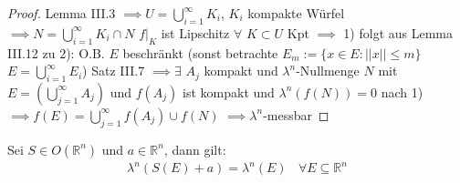     \begin{proof}
	Lemma III.3 $\implies U = \bigcup\limits_{i=1}^{\infty}K_i$, $K_i$ kompakte Würfel \newline
	$\implies N = \bigcup\limits_{i=1}^{\infty}K_i\cap N$ \newline
	$f|_K$ ist Lipschitz $\forall$ $K\subset U$ Kpt \newline
	$\implies$ 1) folgt aus Lemma III.12 \newline
	zu 2): O.B. $E$ beschränkt (sonst betrachte $E_m := \{x\in E: ||x||\leq m \}$ $E = \bigcup\limits_{i=1}^{\infty}E_i$)  \newline
	Satz III.7 $\implies \exists$ $A_j$ kompakt und $\lambda^n$-Nullmenge $N$ mit $E=(\bigcup\limits_{j=1}^{\infty}A_j)$ und $f(A_j)$ ist kompakt und $\lambda^n(f(N)) = 0$ nach 1) \newline
	$\implies f(E) = \bigcup\limits_{j=1}^{\infty}f(A_j) \cup f(N)$ $\implies \lambda^n$-messbar
\end{proof}

  \begin{theorem}
    Sei $S \in O(\mathbb{R}^n)$ und $a \in \mathbb{R}^n$, dann gilt:
    \begin{align*}
      \lambda^n(S(E) + a) = \lambda^n(E) \ \ \ \ \forall E \subseteq \mathbb{R}^n
    \end{align*}
  \end{theorem}

